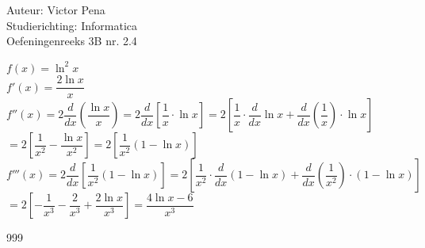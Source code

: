 \documentclass[a4paper]{article}
\newcommand{\dx}{\dfrac{d}{dx}}
\begin{document}
	
	\noindent \large Auteur: Victor Pena \\
	\noindent \large Studierichting: Informatica\\
	\noindent \large Oefeningenreeks 3B nr. 2.4\\
	
	\medskip
	
	\normalsize 
	
	$f(x) = \ln^2 x$ \\
	
	$f'(x) = \dfrac{2\ln x}{x}$ \\ 
	
	$f''(x) = 2\dx\left(\dfrac{\ln x}{x}\right) = 2 \dx \left[\dfrac{1}{x}\cdot \ln x \right] = 2 \left[\dfrac{1}{x}\cdot\dx\ln x + \dx\left(\dfrac{1}{x}\right) \cdot \ln x\right]$ \\
	
	$ = 2\left[\dfrac{1}{x^2} - \dfrac{\ln x}{x^2}\right] = 2\left[\dfrac{1}{x^2}\left(1-\ln x\right)\right]$\\
	
	$f'''(x) = 2\dx\left[\dfrac{1}{x^2}\left(1-\ln x\right)\right] =  2 \left[\dfrac{1}{x^2}\cdot\dx\left(1-\ln x\right) + \dx\left(\dfrac{1}{x^2}\right) \cdot \left(1 - \ln x\right)\right] $\\
	
	$=2\left[-\dfrac{1}{x^3} - \dfrac{2}{x^3} +\dfrac{2\ln x}{x^3}\right] = \dfrac{4\ln x - 6}{x^3}$ 
	
	
	
	\begin{thebibliography}{999}
	\end{thebibliography}
\end{document}
